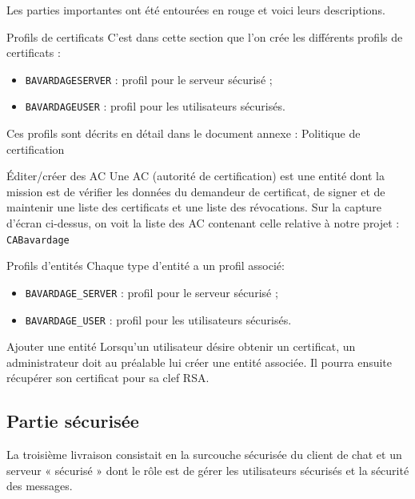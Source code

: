 \documentclass[a4paper,11pt,french]{book}
\begin{document}
Les parties importantes ont été entourées en rouge et voici leurs descriptions.

\begin{paragraph}{Profils de certificats}
C'est dans cette section que l'on crée les différents profils de certificats :
\begin{itemize}
\item \verb+BAVARDAGESERVER+ : profil pour le serveur sécurisé ;
\item \verb+BAVARDAGEUSER+ : profil pour les utilisateurs sécurisés.
\end{itemize}

Ces profils sont décrits en détail dans le document annexe : Politique de certification
\end{paragraph}

\begin{paragraph}{Éditer/créer des AC}
Une AC (autorité de certification) est une entité dont la mission est de vérifier les données du demandeur de certificat, de signer et de maintenir une liste des certificats et une liste des révocations. Sur la capture d'écran ci-dessus, on voit la liste des AC contenant celle relative à notre projet : \verb+CABavardage+
\end{paragraph}


\begin{paragraph}{Profils d'entités}
Chaque type d'entité a un profil associé:
\begin{itemize}
\item \verb+BAVARDAGE_SERVER+ : profil pour le serveur sécurisé ;
\item \verb+BAVARDAGE_USER+ : profil pour les utilisateurs sécurisés.
\end{itemize}
\end{paragraph}


\begin{paragraph}{Ajouter une entité}
Lorsqu'un utilisateur désire obtenir un certificat, un administrateur doit au préalable lui créer une entité associée. Il pourra ensuite récupérer son certificat pour sa clef RSA.
\end{paragraph}


\subsection{Partie sécurisée}
La troisième livraison consistait en la surcouche sécurisée du client de chat et un serveur « sécurisé » dont le rôle est de gérer les utilisateurs sécurisés et la sécurité des messages.
\end{document}
